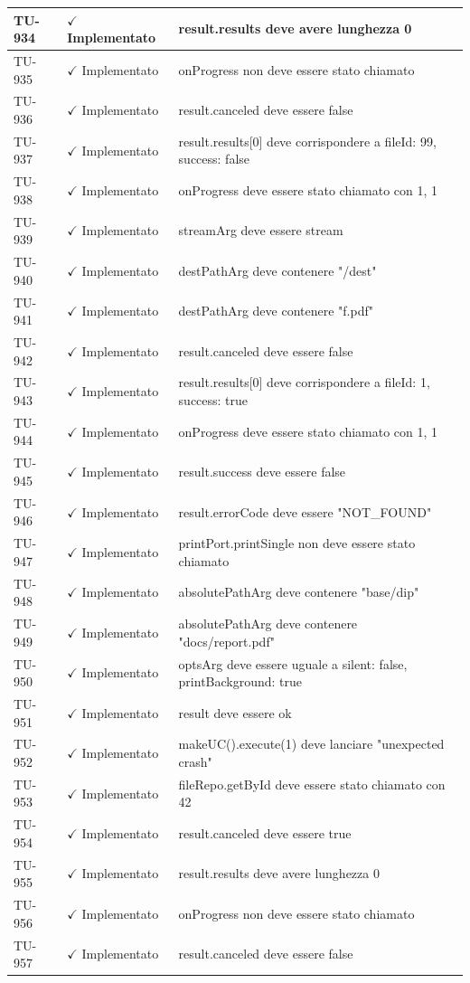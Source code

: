 ﻿\documentclass[a4paper,12pt]{article}
\newcommand{\ok}{\textcolor{green!60!black}{$\checkmark$ Implementato}}
\begin{document}
\begin{longtable}{|p{2cm}|p{3.5cm}|p{9.5cm}|}
\hline
TU-934 & \ok & result.results deve avere lunghezza 0 \\
\hline
TU-935 & \ok & onProgress non deve essere stato chiamato \\
\hline
TU-936 & \ok & result.canceled deve essere false \\
\hline
TU-937 & \ok & result.results[0] deve corrispondere a { fileId: 99, success: false } \\
\hline
TU-938 & \ok & onProgress deve essere stato chiamato con 1, 1 \\
\hline
TU-939 & \ok & streamArg deve essere stream \\
\hline
TU-940 & \ok & destPathArg deve contenere "/dest" \\
\hline
TU-941 & \ok & destPathArg deve contenere "f.pdf" \\
\hline
TU-942 & \ok & result.canceled deve essere false \\
\hline
TU-943 & \ok & result.results[0] deve corrispondere a { fileId: 1, success: true } \\
\hline
TU-944 & \ok & onProgress deve essere stato chiamato con 1, 1 \\
\hline
TU-945 & \ok & result.success deve essere false \\
\hline
TU-946 & \ok & result.errorCode deve essere "NOT\_FOUND" \\
\hline
TU-947 & \ok & printPort.printSingle non deve essere stato chiamato \\
\hline
TU-948 & \ok & absolutePathArg deve contenere "base/dip" \\
\hline
TU-949 & \ok & absolutePathArg deve contenere "docs/report.pdf" \\
\hline
TU-950 & \ok & optsArg deve essere uguale a { silent: false, printBackground: true } \\
\hline
TU-951 & \ok & result deve essere ok \\
\hline
TU-952 & \ok & makeUC().execute(1) deve lanciare "unexpected crash" \\
\hline
TU-953 & \ok & fileRepo.getById deve essere stato chiamato con 42 \\
\hline
TU-954 & \ok & result.canceled deve essere true \\
\hline
TU-955 & \ok & result.results deve avere lunghezza 0 \\
\hline
TU-956 & \ok & onProgress non deve essere stato chiamato \\
\hline
TU-957 & \ok & result.canceled deve essere false \\

\end{longtable}
\end{document}
